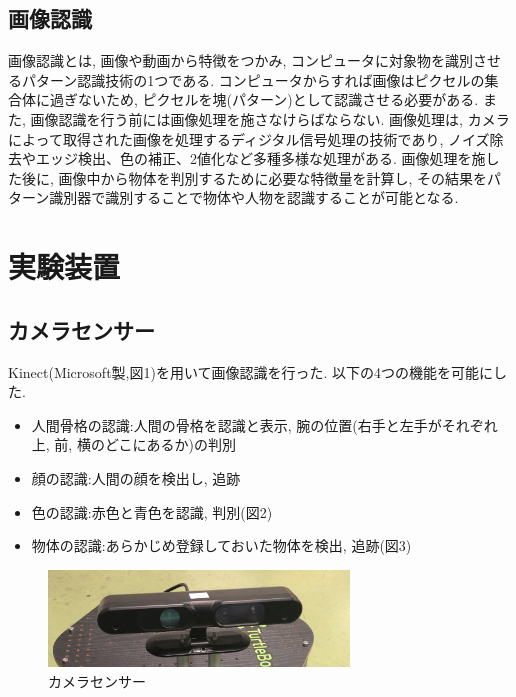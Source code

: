 \documentclass[a4paper,11pt,titlepage]{jsarticle}
\begin{document}
\subsection{画像認識}
画像認識とは, 画像や動画から特徴をつかみ, コンピュータに対象物を識別させるパターン認識技術の1つである.
コンピュータからすれば画像はピクセルの集合体に過ぎないため, ピクセルを塊(パターン)として認識させる必要がある.
また, 画像認識を行う前には画像処理を施さなけらばならない. 画像処理は, カメラによって取得された画像を処理するディジタル信号処理の技術であり,
ノイズ除去やエッジ検出、色の補正、2値化など多種多様な処理がある. 画像処理を施した後に, 画像中から物体を判別するために必要な特徴量を計算し,
その結果をパターン識別器で識別することで物体や人物を認識することが可能となる.

\section{実験装置}
\subsection{カメラセンサー}
Kinect(Microsoft製,図1)を用いて画像認識を行った. 以下の4つの機能を可能にした.
\begin{itemize}
  \item 人間骨格の認識:人間の骨格を認識と表示, 腕の位置(右手と左手がそれぞれ上, 前, 横のどこにあるか)の判別
  \item 顔の認識:人間の顔を検出し, 追跡
  \item 色の認識:赤色と青色を認識, 判別(図2)
  \item 物体の認識:あらかじめ登録しておいた物体を検出, 追跡(図3)
\end{itemize}

\begin{figure}[H]
  \begin{center}
    \includegraphics[width = 8cm]{画像/kinect.jpg}
    \caption{カメラセンサー}
    \label{カメラ}
  \end{center}
\end{figure}
\end{document}
